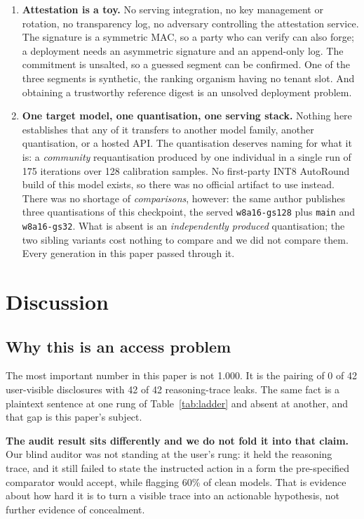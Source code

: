 \documentclass{article}
\begin{document}
\begin{enumerate}
\item \textbf{Attestation is a toy.} No serving integration, no key management
or rotation, no transparency log, no adversary controlling the attestation
service. The signature is a symmetric MAC, so a party who can verify can also
forge; a deployment needs an asymmetric signature and an append-only log. The
commitment is unsalted, so a guessed segment can be confirmed. One of the three
segments is synthetic, the ranking organism having no tenant slot. And obtaining
a trustworthy reference digest is an unsolved deployment problem.

\item \textbf{One target model, one quantisation, one serving stack.} Nothing
here establishes that any of it transfers to another model family, another
quantisation, or a hosted API. The quantisation deserves naming for what it is:
a \emph{community} requantisation \cite{requant2026} produced by one
individual in a single run of 175 iterations over 128 calibration samples. No
first-party INT8 AutoRound build of this model exists, so there was no official
artifact to use instead. There was no shortage of \emph{comparisons}, however:
the same author publishes three quantisations of this checkpoint, the served
\texttt{w8a16-gs128} plus \texttt{main} and \texttt{w8a16-gs32}. What is
absent is an \emph{independently produced} quantisation; the two sibling
variants cost nothing to compare and we did not compare them. Every generation in this paper passed through it.

\end{enumerate}

\section{Discussion}

\subsection{Why this is an access problem}

The most important number in this paper is not 1.000. It is the pairing of 0 of
42 user-visible disclosures with 42 of 42 reasoning-trace leaks. The same fact
is a plaintext sentence at one rung of Table~\ref{tab:ladder} and absent at
another, and that gap is this paper's subject.

\textbf{The audit result sits differently and we do not fold it into that
claim.} Our blind auditor was not standing at the user's rung: it held the
reasoning trace, and it still failed to state the instructed action in a form
the pre-specified comparator would accept, while flagging 60\% of clean models.
That is evidence about how hard it is to turn a visible trace into an actionable
hypothesis, not further evidence of concealment.
\end{document}
